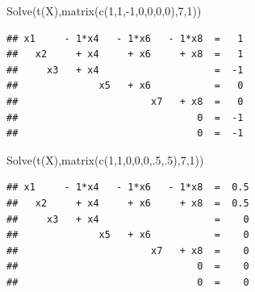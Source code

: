 \documentclass[
]{book}
\newenvironment{Shaded}{\begin{snugshade}}{\end{snugshade}}
\newcommand{\DecValTok}[1]{\textcolor[rgb]{0.00,0.00,0.81}{#1}}
\newcommand{\FunctionTok}[1]{\textcolor[rgb]{0.00,0.00,0.00}{#1}}
\newcommand{\NormalTok}[1]{#1}
\newcommand{\SpecialCharTok}[1]{\textcolor[rgb]{0.00,0.00,0.00}{#1}}
\begin{document}
\begin{Shaded}
\begin{Highlighting}[]
\FunctionTok{Solve}\NormalTok{(}\FunctionTok{t}\NormalTok{(X),}\FunctionTok{matrix}\NormalTok{(}\FunctionTok{c}\NormalTok{(}\DecValTok{1}\NormalTok{,}\DecValTok{1}\NormalTok{,}\SpecialCharTok{{-}}\DecValTok{1}\NormalTok{,}\DecValTok{0}\NormalTok{,}\DecValTok{0}\NormalTok{,}\DecValTok{0}\NormalTok{,}\DecValTok{0}\NormalTok{),}\DecValTok{7}\NormalTok{,}\DecValTok{1}\NormalTok{))}
\end{Highlighting}
\end{Shaded}

\begin{verbatim}
## x1     - 1*x4   - 1*x6   - 1*x8  =   1 
##   x2     + x4     + x6     + x8  =   1 
##     x3   + x4                    =  -1 
##              x5   + x6           =   0 
##                       x7   + x8  =   0 
##                               0  =  -1 
##                               0  =  -1
\end{verbatim}

\begin{Shaded}
\begin{Highlighting}[]
\FunctionTok{Solve}\NormalTok{(}\FunctionTok{t}\NormalTok{(X),}\FunctionTok{matrix}\NormalTok{(}\FunctionTok{c}\NormalTok{(}\DecValTok{1}\NormalTok{,}\DecValTok{1}\NormalTok{,}\DecValTok{0}\NormalTok{,}\DecValTok{0}\NormalTok{,}\DecValTok{0}\NormalTok{,.}\DecValTok{5}\NormalTok{,.}\DecValTok{5}\NormalTok{),}\DecValTok{7}\NormalTok{,}\DecValTok{1}\NormalTok{))}
\end{Highlighting}
\end{Shaded}

\begin{verbatim}
## x1     - 1*x4   - 1*x6   - 1*x8  =  0.5 
##   x2     + x4     + x6     + x8  =  0.5 
##     x3   + x4                    =    0 
##              x5   + x6           =    0 
##                       x7   + x8  =    0 
##                               0  =    0 
##                               0  =    0
\end{verbatim}

  
\end{document}
